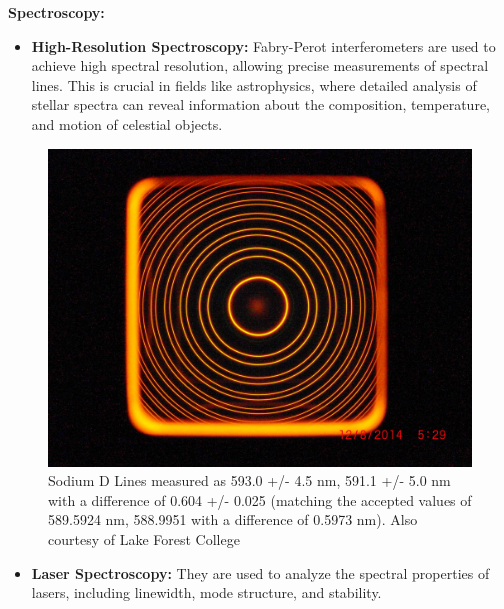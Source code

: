 \documentclass[
  a4paper,
]{book}
\providecommand{\tightlist}{%
  \setlength{\itemsep}{0pt}\setlength{\parskip}{0pt}}
\begin{document}
\begin{tcolorbox}[enhanced jigsaw, coltitle=black, title=\textcolor{quarto-callout-note-color}{\faInfo}\hspace{0.5em}{Applications in Modern Research and Technology}, colframe=quarto-callout-note-color-frame, toprule=.15mm, opacitybacktitle=0.6, left=2mm, opacityback=0, breakable, toptitle=1mm, bottomtitle=1mm, leftrule=.75mm, arc=.35mm, titlerule=0mm, colbacktitle=quarto-callout-note-color!10!white, rightrule=.15mm, bottomrule=.15mm, colback=white]

\textbf{Spectroscopy:}

\begin{itemize}
\tightlist
\item
  \textbf{High-Resolution Spectroscopy:} Fabry-Perot interferometers are
  used to achieve high spectral resolution, allowing precise
  measurements of spectral lines. This is crucial in fields like
  astrophysics, where detailed analysis of stellar spectra can reveal
  information about the composition, temperature, and motion of
  celestial objects.
\end{itemize}

\begin{figure}[H]

{\centering \includegraphics[width=0.5\linewidth,height=\textheight,keepaspectratio]{wave-optics/img/Sodium Rings Solid Etalon.jpg}

}

\caption{Sodium D Lines measured as 593.0 +/- 4.5 nm, 591.1 +/- 5.0 nm
with a difference of 0.604 +/- 0.025 (matching the accepted values of
589.5924 nm, 588.9951 with a difference of 0.5973 nm). Also courtesy of
Lake Forest College}

\end{figure}%

\begin{itemize}
\tightlist
\item
  \textbf{Laser Spectroscopy:} They are used to analyze the spectral
  properties of lasers, including linewidth, mode structure, and
  stability.
\end{itemize}


\end{tcolorbox}
\end{document}

